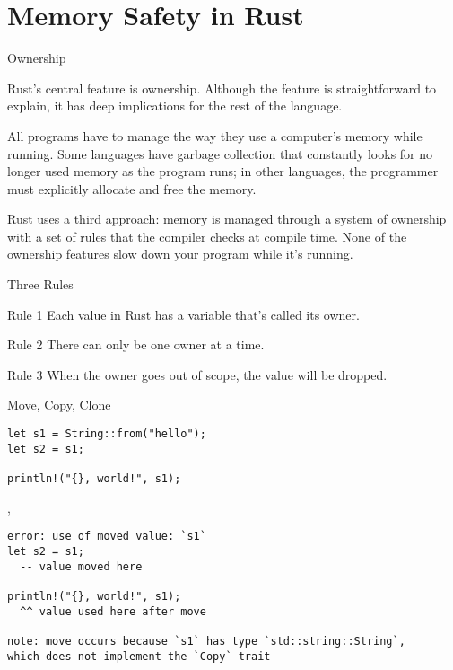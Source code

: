 \section{Memory Safety in Rust}


\begin{frame}{Ownership}

Rust's central feature is ownership.
Although the feature is straightforward to explain,
it has deep implications for the rest of the language.

All programs have to manage the way they use a
computer's memory while running. Some languages
have garbage collection that constantly looks for
no longer used memory as the program runs;
in other languages, the programmer must explicitly
allocate and free the memory.

Rust uses a third approach: memory is managed
through a system of ownership with a set of rules
that the compiler checks at compile time. None of
the ownership features slow down your program
while it's running.

\end{frame}


\begin{frame}[label={threerules}]{Three Rules}

\begin{block}{Rule 1}
Each value in Rust has a variable that’s called its owner.
\end{block}
\begin{block}{Rule 2}
There can only be one owner at a time.
\end{block}
\begin{block}{Rule 3}
When the owner goes out of scope, the value will be dropped.
\end{block}

\end{frame}


\begin{frame}[fragile]{Move, Copy, Clone}

\begin{verbatim}
let s1 = String::from("hello");
let s2 = s1;

println!("{}, world!", s1);
\end{verbatim}

\sep

\begin{verbatim}
error: use of moved value: `s1`
let s2 = s1;
  -- value moved here

println!("{}, world!", s1);
  ^^ value used here after move

note: move occurs because `s1` has type `std::string::String`,
which does not implement the `Copy` trait
\end{verbatim}

\end{frame}